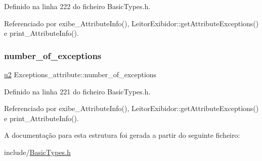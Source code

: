 Definido na linha 222 do ficheiro Basic\+Types.\+h.



Referenciado por exibe\+\_\+\+Attribute\+Info(), Leitor\+Exibidor\+::get\+Attribute\+Exceptions() e print\+\_\+\+Attribute\+Info().

\mbox{\label{structExceptions__attribute_af9f38fbc43eadcb56658f90e8743c90b}} 
\subsubsection{\texorpdfstring{number\+\_\+of\+\_\+exceptions}{number\_of\_exceptions}}
{\footnotesize\ttfamily \hyperlink{BasicTypes_8h_a732cde1300aafb73b0ea6c2558a7a54f}{u2} Exceptions\+\_\+attribute\+::number\+\_\+of\+\_\+exceptions}



Definido na linha 221 do ficheiro Basic\+Types.\+h.



Referenciado por exibe\+\_\+\+Attribute\+Info(), Leitor\+Exibidor\+::get\+Attribute\+Exceptions() e print\+\_\+\+Attribute\+Info().



A documentação para esta estrutura foi gerada a partir do seguinte ficheiro\+:\begin{DoxyCompactItemize}
\item 
include/\hyperlink{BasicTypes_8h}{Basic\+Types.\+h}\end{DoxyCompactItemize}
